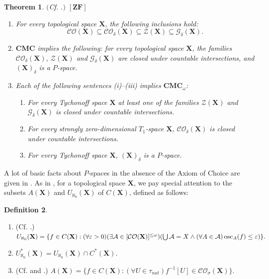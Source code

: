 \documentclass[12pt,twoside,leqno]{article}
\theoremstyle{plain}
\newtheorem{theorem}{Theorem}[section]
\theoremstyle{definition}
\newtheorem{definition}[theorem]{Definition}
\theoremstyle{remark}
\DeclareMathOperator{\osc}{{\rm osc}}
\begin{document}
\begin{theorem}
	\label{s1:t18}
	$($Cf. \cite{kow}.$)$ $[\mathbf{ZF}]$
	\begin{enumerate}
		\item[(a)] For every topological space $\mathbf{X}$, the following inclusions hold: $$\mathcal{CO}(\mathbf{X})\subseteq\mathcal{CO}_{\delta}(\mathbf{X})\subseteq\mathcal{Z}(\mathbf{X})\subseteq\mathcal{G}_{\delta}(\mathbf{X}).$$
		\item[(b)] $\mathbf{CMC}$ implies the following: for every topological space $\mathbf{X}$, the families $\mathcal{CO}_{\delta}(\mathbf{X})$, $\mathcal{Z}(\mathbf{X})$ and $\mathcal{G}_{\delta}(\mathbf{X})$ are closed under countable intersections, and $(\mathbf{X})_{\delta}$ is a $P$-space.
		\item[(c)] Each of the following sentences (i)--(iii) implies $\mathbf{CMC}_{\omega}$:
		\begin{enumerate}
			\item[(i)] For every Tychonoff space $\mathbf{X}$ at least one of the families $\mathcal{Z}(\mathbf{X})$ and $\mathcal{G}_{\delta}(\mathbf{X})$ is closed under countable intersections.
			\item[(ii)] For every strongly zero-dimensional $T_1$-space $\mathbf{X}$, $\mathcal{CO}_{\delta}(\mathbf{X})$ is closed under countable intersections.
			\item[(iii)] For every Tychonoff space $\mathbf{X}$, $(\mathbf{X})_{\delta}$ is a $P$-space.
		\end{enumerate}
	\end{enumerate} 		
\end{theorem}

A lot of basic facts about $P$-spaces in the absence of the Axiom of Choice are given in \cite{kow}. As in \cite{kow}, for a topological space $\mathbf{X}$, we pay special attention to the subsets $A(\mathbf{X})$ and $U_{\aleph_0}(\mathbf{X})$ of $C(\mathbf{X})$, defined as follows:

\begin{definition} 
	\label{s1:d19}
	\begin{enumerate}
		\item[(i)] (Cf. \cite{kow}.)
		$U_{\aleph_0}(\mathbf{X})=\nonumber\\
		\{f\in C(\mathbf{X}): (\forall \varepsilon >0)(\exists \mathcal{A}\in [\mathcal{CO}(\mathbf{X})]^{\leq\omega})(\bigcup\mathcal{A}=X\wedge (\forall A\in\mathcal{A})\osc_A(f)\leq\varepsilon)\}.$
		\item[(ii)] $U_{\aleph_0}^{\ast}(\mathbf{X})=U_{\aleph_0}(\mathbf{X})\cap C^{\ast}(\mathbf{X})$.
		\item[(iii)] (Cf. \cite{bk} and \cite{kow}.) $A(\mathbf{X})=\{f\in C(\mathbf{X}): (\forall U\in\tau_{nat})f^{-1}[U]\in \mathcal{CO}_{\sigma}(\mathbf{X})\}$. 
	\end{enumerate}
\end{definition}
\end{document}
